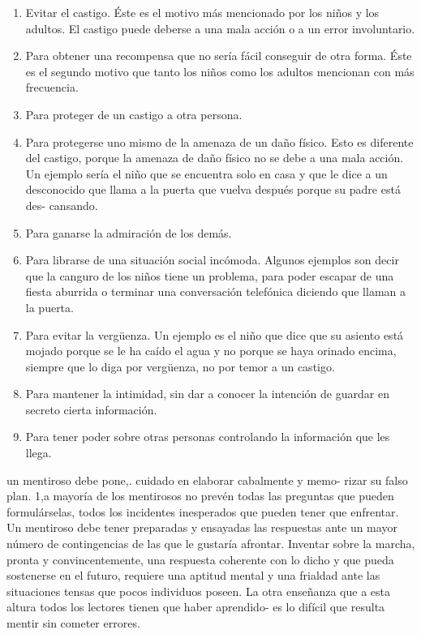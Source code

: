 \begin{enumerate}
\item Evitar el castigo. Éste es el motivo más mencionado por los niños y los adultos. El castigo puede deberse a una mala acción o a un error involuntario. 
\item Para obtener una recompensa que no sería fácil conseguir de otra forma. Éste es el segundo motivo que tanto los niños como los adultos mencionan con más frecuencia. 
\item Para proteger de un castigo a otra persona. 
\item Para protegerse uno mismo de la amenaza de un daño físico. Esto es diferente del castigo, porque la amenaza de daño físico no se debe a una mala acción. Un ejemplo sería el niño que se encuentra solo en casa y que le dice a un desconocido que llama a la puerta que vuelva después porque su padre está des- cansando. 
\item Para ganarse la admiración de los demás. 
\item Para librarse de una situación social incómoda. Algunos ejemplos son decir que la canguro de los niños tiene un problema, para poder escapar de una fiesta aburrida o terminar una conversación telefónica diciendo que llaman a la puerta. 
\item Para evitar la vergüenza. Un ejemplo es el niño que dice que su asiento está mojado porque se le ha caído el agua y no porque se haya orinado encima, siempre que lo diga por vergüenza, no por temor a un castigo. 
\item Para mantener la intimidad, sin dar a  conocer la intención de guardar en secreto cierta información. 
\item Para tener poder sobre otras personas controlando la información que les llega.
\end{enumerate}
un mentiroso debe pone,. cuidado en elaborar cabalmente y memo- rizar su falso plan. 1,a mayoría de los mentirosos no prevén todas las preguntas que pueden formulárselas, todos los incidentes inesperados que pueden tener que enfrentar. Un mentiroso debe tener preparadas y ensayadas las respuestas ante un mayor número de contingencias de las que le gustaría afrontar. Inventar sobre la marcha, pronta y  convincentemente, una respuesta coherente con lo dicho y que pueda sostenerse en el futuro, requiere una aptitud mental y una frialdad ante las situaciones tensas que pocos individuos poseen. La otra enseñanza que a esta altura todos los lectores tienen que haber aprendido- es lo difícil que resulta mentir sin cometer errores.

